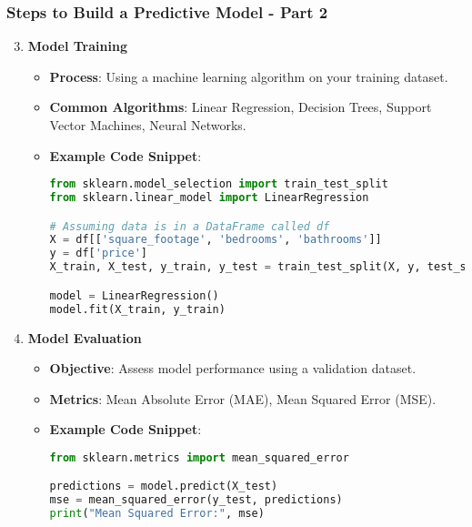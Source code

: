 \documentclass{beamer}
\begin{document}
\begin{frame}[fragile]
    \frametitle{Steps to Build a Predictive Model - Part 2}
    \begin{enumerate}
        \setcounter{enumi}{2} %
        \item \textbf{Model Training}
            \begin{itemize}
                \item \textbf{Process}: Using a machine learning algorithm on your training dataset.
                \item \textbf{Common Algorithms}: Linear Regression, Decision Trees, Support Vector Machines, Neural Networks.
                \item \textbf{Example Code Snippet}:
                \begin{lstlisting}[language=Python]
from sklearn.model_selection import train_test_split
from sklearn.linear_model import LinearRegression

# Assuming data is in a DataFrame called df
X = df[['square_footage', 'bedrooms', 'bathrooms']]
y = df['price']
X_train, X_test, y_train, y_test = train_test_split(X, y, test_size=0.2, random_state=42)

model = LinearRegression()
model.fit(X_train, y_train)
                \end{lstlisting}
            \end{itemize}

        \item \textbf{Model Evaluation}
            \begin{itemize}
                \item \textbf{Objective}: Assess model performance using a validation dataset.
                \item \textbf{Metrics}: Mean Absolute Error (MAE), Mean Squared Error (MSE).
                \item \textbf{Example Code Snippet}:
                \begin{lstlisting}[language=Python]
from sklearn.metrics import mean_squared_error

predictions = model.predict(X_test)
mse = mean_squared_error(y_test, predictions)
print("Mean Squared Error:", mse)
                \end{lstlisting}
            \end{itemize}
    \end{enumerate}
\end{frame}
\end{document}
